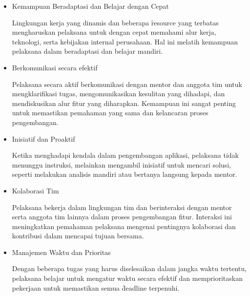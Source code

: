 \begin{itemize}
    \item Kemampuan Beradaptasi dan Belajar dengan Cepat
    
    Lingkungan kerja yang dinamis dan beberapa \f{resource} yang terbatas
    mengharuskan pelaksana untuk dengan cepat memahami alur kerja, teknologi,
    serta kebijakan internal perusahaan. Hal ini melatih kemampuan pelaksana
    dalam beradaptasi dan belajar mandiri.
    
    \item Berkomunikasi secara efektif
    
    Pelaksana secara aktif berkomunikasi
    dengan mentor dan anggota tim untuk mengklarifikasi tugas, mengomunikasikan
    kesulitan yang dihadapi, dan mendiskusikan alur fitur yang diharapkan.
    Kemampuan ini sangat penting untuk memastikan pemahaman yang sama dan
    kelancaran proses pengembangan.
    
    \item Inisiatif dan Proaktif
    
    Ketika menghadapi kendala dalam pengembangan
    aplikasi, pelaksana tidak menunggu instruksi, melainkan mengambil inisiatif
    untuk mencari solusi, seperti melakukan analisis mandiri atau bertanya
    langsung kepada mentor.
    
    \item Kolaborasi Tim
    
    Pelaksana bekerja dalam lingkungan tim dan berinteraksi
    dengan mentor serta anggota tim lainnya dalam proses pengembangan fitur.
    Interaksi ini meningkatkan pemahaman pelaksana mengenai pentingnya kolaborasi
    dan kontribusi dalam mencapai tujuan bersama.
    
    \item Manajemen Waktu dan Prioritas
    
    Dengan beberapa tugas yang harus
    diselesaikan dalam jangka waktu tertentu, pelaksana belajar untuk mengatur
    waktu secara efektif dan memprioritaskan pekerjaan untuk memastikan semua
    \f{deadline} terpenuhi.
\end{itemize}



